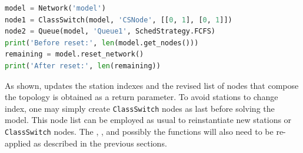 \begin{PYTHON}
\begin{lstlisting}[language=python]
model = Network('model')
node1 = ClassSwitch(model, 'CSNode', [[0, 1], [0, 1]])
node2 = Queue(model, 'Queue1', SchedStrategy.FCFS)
print('Before reset:', len(model.get_nodes()))
remaining = model.reset_network()
print('After reset:', len(remaining))
\end{lstlisting}
\end{PYTHON}
As shown,  updates the station indexes and the revised list of nodes that compose the topology is obtained as a return parameter. To avoid stations to change index, one may simply create  \texttt{ClassSwitch} nodes as last before solving the model. This node list can be employed as usual to reinstantiate new stations or \texttt{ClassSwitch} nodes. The , , and possibly the  functions will also need to be re-applied as described in the previous sections.

